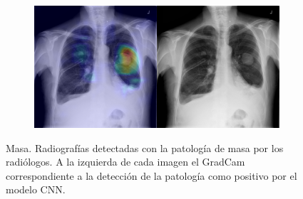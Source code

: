 \begin{figure}[b]
\begin{subfigure}{0.4\textwidth}
    \end{subfigure}
    \begin{subfigure}{0.4\textwidth}
        \centering
        \includegraphics[width=1.0\textwidth]{Chapters/5. Conclusiones/img/Mass/1_1_00022837_011.png}
    \end{subfigure}

    \caption{Masa. Radiografías detectadas con la patología de masa por los
                    radiólogos. A la izquierda de cada imagen el GradCam correspondiente a la detección
                    de la patología como positivo por el modelo CNN.}
\end{figure}

